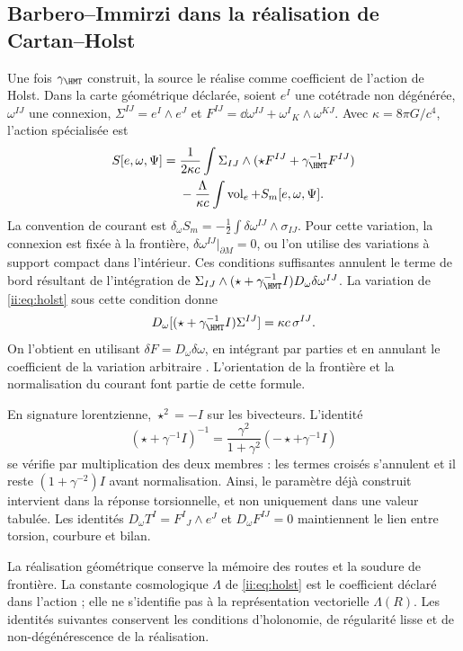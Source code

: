 \subsection{Barbero--Immirzi dans la réalisation de Cartan--Holst}
Une fois $\gamma_{\HMT}$ construit, la source le réalise comme
coefficient de l'action de Holst. Dans la carte géométrique déclarée,
soient $e^I$ une cotétrade non dégénérée, $\omega^{IJ}$ une connexion,
$\Sigma^{IJ}=e^I\wedge e^J$ et
$F^{IJ}=\dd\omega^{IJ}+\omega^I{}_K\wedge\omega^{KJ}$.
Avec $\kappa=8\pi G/c^4$, l'action spécialisée est
\begin{equation}
\begin{aligned}
S[e,\omega,\Psi]
={}&\frac1{2\kappa c}\int
\Sigma_{IJ}\wedge(\star F^{IJ}+\gamma_{\HMT}^{-1}F^{IJ})\\
&-\frac{\Lambda}{\kappa c}\int\operatorname{vol}_e
+S_m[e,\omega,\Psi].
\end{aligned}
\label{ii:eq:holst}
\end{equation}
La convention de courant est
$\delta_\omega S_m=-\tfrac12\int\delta\omega^{IJ}\wedge\sigma_{IJ}$.
Pour cette variation, la connexion est fixée à la frontière,
$\delta\omega^{IJ}|_{\partial M}=0$, ou l'on utilise des variations à
support compact dans l'intérieur. Ces conditions suffisantes annulent
le terme de bord résultant de l'intégration de
$\Sigma_{IJ}\wedge(\star+\gamma_{\HMT}^{-1}I)
D_\omega\delta\omega^{IJ}$.
La variation de \eqref{ii:eq:holst} sous cette condition donne
\[
D_\omega[(\star+\gamma_{\HMT}^{-1}I)\Sigma^{IJ}]
=\kappa c\,\sigma^{IJ}.
\]
On l'obtient en utilisant $\delta F=D_\omega\delta\omega$, en intégrant par parties
et en annulant le coefficient de la variation arbitraire
\cite{ii:holst1996}. L'orientation de la frontière et la normalisation
du courant font partie de cette formule.

En signature lorentzienne, $\star^2=-I$ sur les bivecteurs. L'identité
\[
(\star+\gamma^{-1}I)^{-1}
=\frac{\gamma^2}{1+\gamma^2}(-\star+\gamma^{-1}I)
\]
se vérifie par multiplication des deux membres : les termes croisés
s'annulent et il reste $(1+\gamma^{-2})I$ avant normalisation.
Ainsi, le paramètre déjà construit intervient dans la réponse torsionnelle,
et non uniquement dans une valeur tabulée.
Les identités
$D_\omega T^I=F^I{}_J\wedge e^J$ et $D_\omega F^{IJ}=0$
maintiennent le lien entre torsion, courbure et bilan.

La réalisation géométrique conserve la mémoire des routes et la
soudure de frontière. La constante cosmologique \(\Lambda\) de
\eqref{ii:eq:holst} est le coefficient déclaré dans l’action ; elle ne
s’identifie pas à la représentation vectorielle \(\Lambda(R)\).
Les identités suivantes conservent les conditions d’holonomie,
de régularité lisse et de non-dégénérescence de la réalisation.

